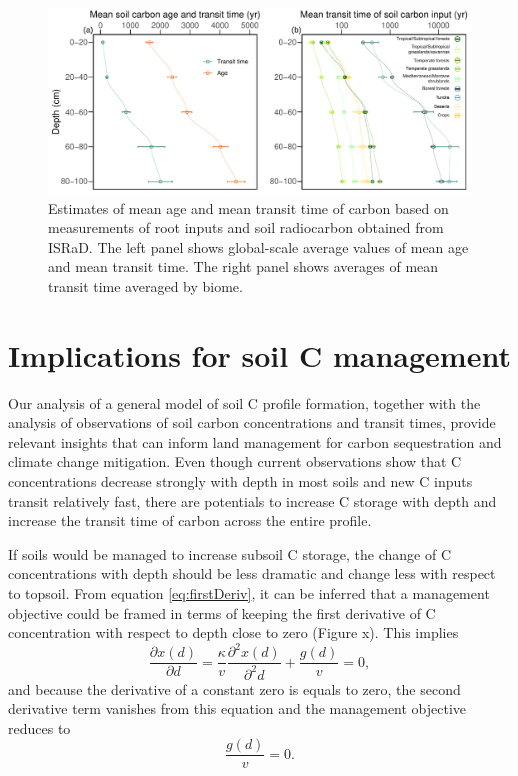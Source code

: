 \documentclass[11pt, oneside, a4paper]{article}   	%
\begin{document}
\begin{figure}[htbp]
   \centering
   \includegraphics[width=\textwidth]{Figures/biomeTransitTimes.pdf} %
   \caption{Estimates of mean age and mean transit time of carbon based on measurements of root inputs and soil radiocarbon obtained from ISRaD. The left panel shows global-scale average values of mean age and mean transit time. The right panel shows averages of mean transit time averaged by biome.}
   \label{fig:AgeTTprofiles}
\end{figure}

\section{Implications for soil C management}
Our analysis of a general model of soil C profile formation, together with the analysis of observations of soil carbon concentrations and transit times, provide relevant insights that can inform land management for carbon sequestration and climate change mitigation. 
Even though current observations show that C concentrations decrease strongly with depth in most soils and new C inputs transit relatively fast, there are potentials to increase C storage with depth and increase the transit time of carbon across the entire profile. 

If soils would be managed to increase subsoil C storage, the change of C concentrations with depth should be less dramatic and change less with respect to topsoil. From equation \ref{eq:firstDeriv}, it can be inferred that a management objective could be framed in terms of keeping the first derivative of C concentration with respect to depth close to zero (Figure x). This implies
\begin{equation}
\frac{\partial x(d)}{\partial d} = \frac{\kappa}{v} \frac{\partial^2 x(d)}{\partial^2 d} + \frac{g(d)}{v} = 0,
\end{equation} 
and because the derivative of a constant zero is equals to zero, the second derivative term vanishes from this equation and the management objective reduces to
\begin{equation} \label{eq:objective}
 \frac{g(d)}{v} = 0.
\end{equation} 
\end{document}
